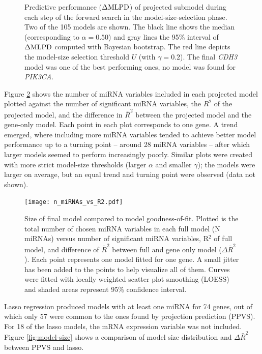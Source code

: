 \begin{figure}[!h]
  \caption{Predictive performance ($\Delta\textup{MLPD}$) of projected submodel during
  each step of the forward search in the model-size-selection phase. Two of the 105 models are shown.
  The black line shows the median (corresponding to $\alpha = 0.50$) and
  gray lines the 95\% interval of $\Delta\textup{MLPD}$ computed with Bayesian bootstrap.
  The red line depicts the model-size selection threshold $U$ (with $\gamma=0.2$).
  The final \emph{CDH3} model was one of the best performing ones,
  no model was found for \emph{PIK3CA}.}
  \label{fig:forward-search}
\end{figure}

Figure \ref{fig:n-miRNAs-vs-R2} shows the number of miRNA variables included in
each projected model plotted against the number of significant miRNA
variables, the $R^2$ of the projected model, and the difference in $\bar{R}^2$
between the projected model and the gene-only model. Each point in each plot
corresponds to one gene. A trend emerged, where including more
miRNA variables tended to achieve better model performance up to a turning point --
around 28 miRNA variables -- after which larger models seemed to perform
increasingly poorly. Similar plots were created with more strict model-size
thresholds (larger $\alpha$ and smaller $\gamma$); the models were larger on
average, but an equal trend and turning point were observed (data not shown).

\begin{figure}[!h]
  \centering
  \texttt{[image: n\_miRNAs\_vs\_R2.pdf]}
  \caption{Size of final model compared to model goodness-of-fit. Plotted is
  the total number of chosen miRNA variables in each full model (N miRNAs)
  versus number of significant miRNA variables, R$^2$ of full model, and
  difference of $\bar{R}^2$ between full and gene only model
  ($\Delta\bar{R}^2$). Each point represents one model fitted for one gene. A
  small jitter has been added to the points to help visualize all of them.
  Curves were fitted with locally weighted scatter plot smoothing (LOESS) and
  shaded areas represent 95\% confidence interval.}
  \label{fig:n-miRNAs-vs-R2}
\end{figure}

Lasso regression produced models with at least one miRNA for 74 genes, out of
which only 57 were common to the ones found by projection prediction (PPVS).
For 18 of the lasso models, the mRNA expression variable was not included.
Figure \ref{fig:model-size} shows a comparison of model size distribution
and $\Delta\bar{R}^2$ between PPVS and lasso.

